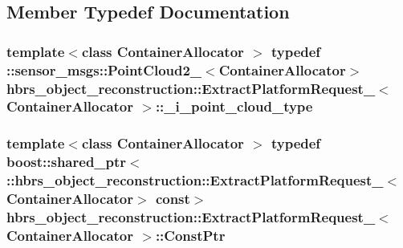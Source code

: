 \subsection{\-Member \-Typedef \-Documentation}
\hypertarget{structhbrs__object__reconstruction_1_1_extract_platform_request___a4f57580f0c3987e492f8dbe76c54f8fb}{
\subsubsection[{\-\_\-i\-\_\-point\-\_\-cloud\-\_\-type}]{\setlength{\rightskip}{0pt plus 5cm}template$<$class Container\-Allocator $>$ typedef \-::sensor\-\_\-msgs\-::\-Point\-Cloud2\-\_\-$<$\-Container\-Allocator$>$ {\bf hbrs\-\_\-object\-\_\-reconstruction\-::\-Extract\-Platform\-Request\-\_\-}$<$ \-Container\-Allocator $>$\-::{\bf \-\_\-i\-\_\-point\-\_\-cloud\-\_\-type}}}\label{structhbrs__object__reconstruction_1_1_extract_platform_request___a4f57580f0c3987e492f8dbe76c54f8fb}
\hypertarget{structhbrs__object__reconstruction_1_1_extract_platform_request___ae4179c7c14d509e044221a3f1f8129d2}{
\subsubsection[{\-Const\-Ptr}]{\setlength{\rightskip}{0pt plus 5cm}template$<$class Container\-Allocator $>$ typedef boost\-::shared\-\_\-ptr$<$ \-::{\bf hbrs\-\_\-object\-\_\-reconstruction\-::\-Extract\-Platform\-Request\-\_\-}$<$\-Container\-Allocator$>$ const$>$ {\bf hbrs\-\_\-object\-\_\-reconstruction\-::\-Extract\-Platform\-Request\-\_\-}$<$ \-Container\-Allocator $>$\-::{\bf \-Const\-Ptr}}}\label{structhbrs__object__reconstruction_1_1_extract_platform_request___ae4179c7c14d509e044221a3f1f8129d2}
